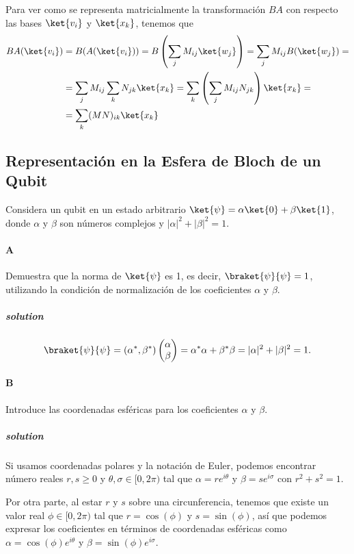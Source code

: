 	Para ver como se representa matricialmente la transformación $BA$ con respecto las bases $\ket{v_i}$ y $\ket{x_k}$, tenemos que
	\begin{equation*}
		\begin{split}
			BA(\ket{v_i})&=B(A(\ket{v_i}))=B\left(\sum_{j} M_{ij}\ket{w_j}\right)=\sum_{j} M_{ij}B(\ket{w_j})= \\
			&=\sum_{j} M_{ij}\sum_{k} N_{jk}\ket{x_k}=
			\sum_{k} \left(\sum_{j} M_{ij} N_{jk}\right)\ket{x_k}=\\
			&=\sum_{k} (MN)_{ik}\ket{x_k}
		\end{split}
	\end{equation*}


\subsection{Representación en la Esfera de Bloch de un Qubit}
Considera un qubit en un estado arbitrario $\ket{\psi}=\alpha\ket{0}+\beta\ket{1}$, donde $\alpha$ y $\beta$ son
números complejos y $|\alpha|^2 + |\beta|^2 = 1$.

\paragraph{A} Demuestra que la norma de $\ket{\psi}$ es 1, es decir, $\braket{\psi}{\psi} = 1$, utilizando la
condición de normalización de los coeficientes $\alpha$ y $\beta$.
\subparagraph{solution}
	\begin{equation*}
		\braket{\psi}{\psi}=(\alpha^*, \beta^*)\left(\begin{matrix}\alpha\\ \beta\end{matrix}\right) = \alpha^*\alpha + \beta^*\beta = |\alpha|^2 + |\beta|^2 = 1.
	\end{equation*}

\paragraph{B} Introduce las coordenadas esféricas para los coeficientes $\alpha$ y $\beta$.
\subparagraph{solution}
	Si usamos coordenadas polares y la notación de Euler, podemos encontrar número reales $r, s\geq 0$ y $\theta, \sigma\in [0,2\pi)$ tal que $\alpha=re^{i\theta}$ y $\beta=se^{i\sigma}$ con $r^2 + s^2 = 1$.

	Por otra parte, al estar $r$ y $s$ sobre una circunferencia, tenemos que existe un valor real $\phi\in [0,2\pi)$ tal que $r=\cos(\phi)$ y $s=\sin(\phi)$, así que podemos expresar los coeficientes en términos de coordenadas esféricas como $\alpha=\cos(\phi)e^{i\theta}$ y $\beta=\sin(\phi)e^{i\sigma}$.

